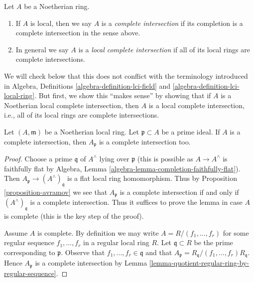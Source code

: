 \begin{definition}
\label{definition-lci}
Let $A$ be a Noetherian ring.
\begin{enumerate}
\item If $A$ is local, then we say $A$ is a {\it complete intersection}
if its completion is a complete intersection in the sense above.
\item In general we say $A$ is a {\it local complete intersection}
if all of its local rings are complete intersections.
\end{enumerate}
\end{definition}

\noindent
We will check below that this does not conflict with the terminology
introduced in
Algebra, Definitions \ref{algebra-definition-lci-field} and
\ref{algebra-definition-lci-local-ring}.
But first, we show this ``makes sense'' by showing
that if $A$ is a Noetherian
local complete intersection, then $A$ is a local complete intersection,
i.e., all of its local rings are complete intersections.

\begin{lemma}
\label{lemma-ci-good}
Let $(A, \mathfrak m)$ be a Noetherian local ring. Let
$\mathfrak p \subset A$ be a prime ideal. If $A$ is a complete
intersection, then $A_\mathfrak p$ is a complete intersection too.
\end{lemma}

\begin{proof}
Choose a prime $\mathfrak q$ of $A^\wedge$ lying over $\mathfrak p$
(this is possible as $A \to A^\wedge$ is faithfully flat by
Algebra, Lemma \ref{algebra-lemma-completion-faithfully-flat}).
Then $A_\mathfrak p \to (A^\wedge)_\mathfrak q$ is a flat local
ring homomorphism. Thus by Proposition \ref{proposition-avramov}
we see that $A_\mathfrak p$ is a complete intersection if and only if
$(A^\wedge)_\mathfrak q$ is a complete intersection. Thus it suffices
to prove the lemma in case $A$ is complete (this is the key step
of the proof).

\medskip\noindent
Assume $A$ is complete. By definition we may write
$A = R/(f_1, \ldots, f_r)$ for some regular sequence
$f_1, \ldots, f_r$ in a regular local ring $R$.
Let $\mathfrak q \subset R$ be the prime corresponding to $\mathfrak p$.
Observe that $f_1, \ldots, f_r \in \mathfrak q$ and that
$A_\mathfrak p = R_\mathfrak q/(f_1, \ldots, f_r)R_\mathfrak q$.
Hence $A_\mathfrak p$ is a complete intersection by
Lemma \ref{lemma-quotient-regular-ring-by-regular-sequence}.
\end{proof}

